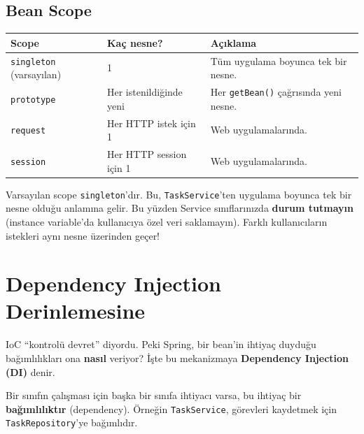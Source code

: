 \documentclass[11pt,a4paper]{article}
\begin{document}
\subsection*{Bean Scope}

\begin{center}
\begin{tabular}{llp{6cm}}
\toprule
\textbf{Scope} & \textbf{Ka\c{c} nesne?} & \textbf{A\c{c}{\i}klama} \\
\midrule
\texttt{singleton} (varsay{\i}lan) & 1 & T\"{u}m uygulama boyunca tek bir nesne. \\
\texttt{prototype} & Her istenildi\u{g}inde yeni & Her \texttt{getBean()} \c{c}a\u{g}r{\i}s{\i}nda yeni nesne. \\
\texttt{request} & Her HTTP istek i\c{c}in 1 & Web uygulamalar{\i}nda. \\
\texttt{session} & Her HTTP session i\c{c}in 1 & Web uygulamalar{\i}nda. \\
\bottomrule
\end{tabular}
\end{center}

\begin{warningbox}
Varsay{\i}lan scope \texttt{singleton}'d{\i}r. Bu, \texttt{TaskService}'ten uygulama boyunca tek bir nesne oldu\u{g}u anlam{\i}na gelir. Bu y\"{u}zden Service s{\i}n{\i}flar{\i}n{\i}zda \textbf{durum tutmay{\i}n} (instance variable'da kullan{\i}c{\i}ya \"{o}zel veri saklamay{\i}n). Farkl{\i} kullan{\i}c{\i}lar{\i}n istekleri ayn{\i} nesne \"{u}zerinden ge\c{c}er!
\end{warningbox}

\newpage

\section{Dependency Injection Derinlemesine}

IoC ``kontrol\"{u} devret'' diyordu. Peki Spring, bir bean'in ihtiya\c{c} duydu\u{g}u ba\u{g}{\i}ml{\i}l{\i}klar{\i} ona \textbf{nas{\i}l} veriyor? \.{I}\c{s}te bu mekanizmaya \textbf{Dependency Injection (DI)} denir.

Bir s{\i}n{\i}f{\i}n \c{c}al{\i}\c{s}mas{\i} i\c{c}in ba\c{s}ka bir s{\i}n{\i}fa ihtiyac{\i} varsa, bu ihtiya\c{c} bir \textbf{ba\u{g}{\i}ml{\i}l{\i}kt{\i}r} (dependency). \"{O}rne\u{g}in \texttt{TaskService}, g\"{o}revleri kaydetmek i\c{c}in \texttt{TaskRepository}'ye ba\u{g}{\i}ml{\i}d{\i}r.
\end{document}
